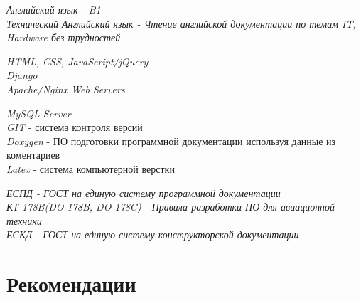 
{
\textit{Английский язык - B1}\\
\textit{Технический Английский язык - Чтение английской документации по темам IT, Hardware без трудностей.}
}


{
\textit{HTML, CSS, JavaScript/jQuery}\\
\textit{Django}\\
\textit{Apache/Nginx Web Servers}\\
}


{
\textit{MySQL Server}\\
\textit{GIT} - система контроля версий\\
\textit{Doxygen} - ПО подготовки программной документации используя данные из коментариев\\
\textit{Latex} - система компьютерной верстки

}


{
\textit{ЕСПД - ГОСТ на единую систему программной документации}\\
\textit{КТ-178B(DO-178B, DO-178C) - Правила разработки ПО для авиационной техники}\\
\textit{ЕСКД - ГОСТ на единую систему конструкторской документации}\\
}



\section{Рекомендации}

